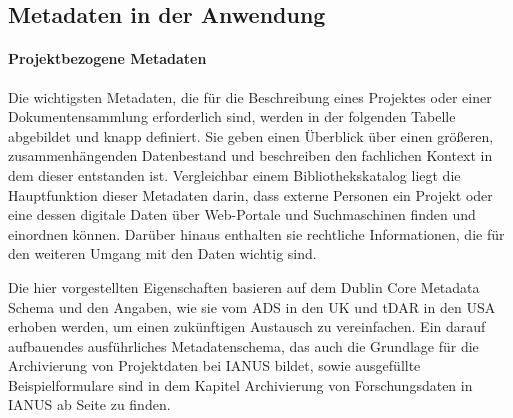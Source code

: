 \subsection{Metadaten in der Anwendung}
\label{Metadaten-anwendung}
\paragraph{Projektbezogene Metadaten}
Die wichtigsten Metadaten, die für die Beschreibung eines Projektes oder einer Dokumentensammlung erforderlich sind, werden in der folgenden Tabelle abgebildet und knapp definiert. Sie geben einen Überblick über einen größeren, zusammenhängenden Datenbestand und beschreiben den fachlichen Kontext in dem dieser entstanden ist. Vergleichbar einem Bibliothekskatalog liegt die Hauptfunktion dieser Metadaten darin, dass externe Personen ein Projekt oder eine dessen digitale Daten über Web-Portale und Suchmaschinen finden und einordnen können. Darüber hinaus enthalten sie rechtliche Informationen, die für den weiteren Umgang mit den Daten wichtig sind. 

Die hier vorgestellten Eigenschaften basieren auf dem Dublin Core Metadata Schema und den Angaben, wie sie vom ADS in den UK und tDAR in den USA erhoben werden, um einen zukünftigen Austausch zu vereinfachen. Ein darauf aufbauendes ausführliches Metadatenschema, das auch die Grundlage für die Archivierung von Projektdaten bei IANUS bildet, sowie ausgefüllte Beispielformulare sind in dem Kapitel Archivierung von Forschungsdaten in IANUS ab Seite \pageref{archivierungIANUS} zu finden.

